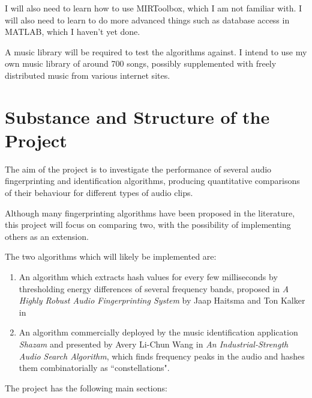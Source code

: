 \documentclass[12pt]{article}
\begin{document}
I will also need to learn how to use MIRToolbox, which I am not familiar with. I will also need to learn to do more advanced things such as database access in MATLAB, which I haven't yet done.

A music library will be required to test the algorithms against. I intend to use my own music library of around 700 songs, possibly supplemented with freely distributed music from various internet sites. 

\section*{Substance and Structure of the Project}

The aim of the project is to investigate the performance of several audio fingerprinting and identification algorithms, producing quantitative comparisons of their behaviour for different types of audio clips. 

Although many fingerprinting algorithms have been proposed in the literature, this project will focus on comparing two, with the possibility of implementing others as an extension. 

The two algorithms which will likely be implemented are:

\begin{enumerate}

\item An algorithm which extracts hash values for every few milliseconds by thresholding energy differences of several frequency bands, proposed in \emph{A Highly Robust Audio Fingerprinting System} by Jaap Haitsma and Ton Kalker in 

\item An algorithm commercially deployed by the music identification application \emph{Shazam} and presented by Avery Li-Chun Wang in \emph{An Industrial-Strength Audio Search Algorithm}, which finds frequency peaks in the audio and hashes them combinatorially as ``constellations".

\end{enumerate}

The project has the following main sections:
\end{document}
